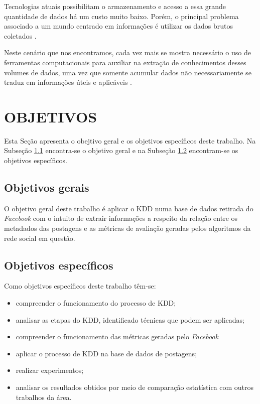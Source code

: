 Tecnologias atuais possibilitam o armazenamento e acesso a essa grande quantidade de dados há um custo muito baixo. Porém, o principal problema associado a um mundo centrado em informações é utilizar os dados brutos coletados .

Neste cenário que nos encontramos, cada vez mais se mostra necessário o uso de ferramentas computacionais para auxiliar na extração de conhecimentos desses volumes de dados, uma vez que somente acumular dados não necessariamente se traduz em informações úteis e aplicáveis .

\section{OBJETIVOS}
\label{sec:objetivos}
Esta Seção apresenta o obejtivo geral e os objetivos específicos deste trabalho. Na Subseção \ref{subsec:objGerais} encontra-se o objetivo geral e na Subseção \ref{subsec:objEspecificos} encontram-se os objetivos específicos.

\subsection{Objetivos gerais}
\label{subsec:objGerais}
O objetivo geral deste trabalho é aplicar o KDD numa base de dados retirada do \textit{Facebook} com o intuito de extrair informações a respeito da relação entre os metadados das postagens e as métricas de avaliação geradas pelos algoritmos da rede social em questão.


\subsection{Objetivos específicos}
\label{subsec:objEspecificos}
Como objetivos específicos deste trabalho têm-se:
\begin{itemize}
	\item compreender o funcionamento do processo de KDD;
	\item analisar as etapas do KDD, identificado técnicas que podem ser aplicadas;
	\item compreender o funcionamento das métricas geradas pelo \textit{Facebook}
	\item aplicar o processo de KDD na base de dados de postagens;
	\item realizar experimentos;
	\item analisar os resultados obtidos por meio de comparação estatística com outros trabalhos da área.
\end{itemize}

